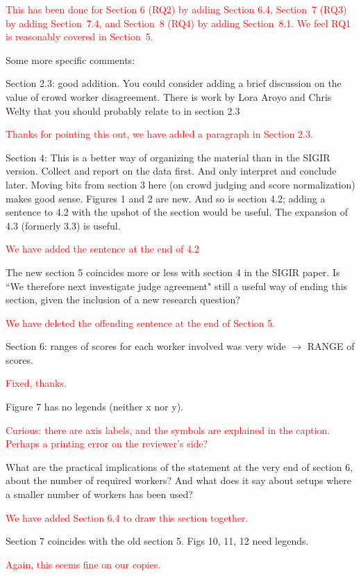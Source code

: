 \documentclass[a4paper]{article}
\newcommand{\comment}[1]{\vspace{1em} \textcolor{red}{{#1}} \vspace{1em}}
\begin{document}
\comment{
This has been done for Section 6 (RQ2) by adding Section 6.4, 
Section~7 (RQ3) by adding Section~7.4, and
Section~8 (RQ4) by adding Section~8.1.
We feel RQ1 is reasonably covered in Section~5.
}

Some more specific comments:

Section 2.3: good addition. You could consider adding a brief
discussion on the value of crowd worker disagreement. There is work
by Lora Aroyo and Chris Welty that you should probably relate to
in section 2.3

\comment {Thanks for pointing this out, we have added a paragraph in Section 2.3.}

Section 4: This is a better way of organizing the material than in
the SIGIR version. Collect and report on the data first. And only
interpret and conclude later. Moving bits from section 3 here (on
crowd judging and score normalization) makes good sense. Figures 1
and 2 are new. And so is section 4.2; adding a sentence to 4.2 with
the upshot of the section would be useful. The expansion of 4.3
(formerly 3.3) is useful.

\comment {We have added the sentence at the end of 4.2}

The new section 5 coincides more  or less with section 4 in the
SIGIR paper. Is ``We therefore next investigate judge agreement"
still a useful  way of ending this section, given the inclusion of
a new research question?

\comment {We have deleted the offending sentence at the end of Section 5.}

Section 6:  ranges of scores for each worker involved was very wide
$\rightarrow$ RANGE of scores. 

\comment {Fixed, thanks.}

Figure 7 has no legends (neither x nor y).

\comment {Curious: there are axis labels, and the symbols are explained
in the caption. Perhaps a printing error on the reviewer's side?} 

What are the practical implications of the statement at the very
end of section 6, about the number of required workers? And what
does it say about setups where a smaller number of workers has been
used?

\comment {We have added Section 6.4 to draw this section together.}

Section 7 coincides with the old section 5. 
Figs 10, 11, 12 need legends. 

\comment {Again, this seems fine on our copies.}
\end{document}
